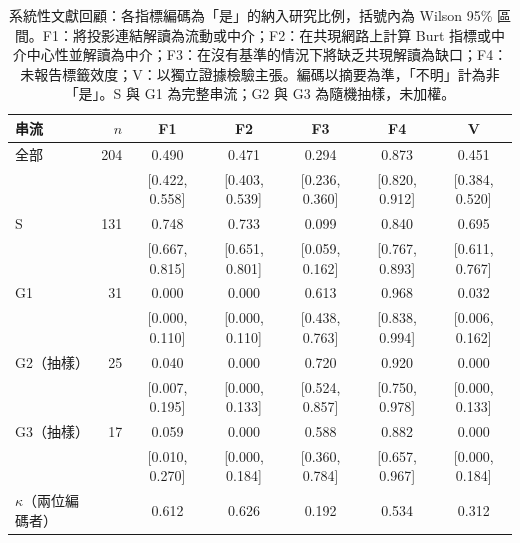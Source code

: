 \begin{table}[tbp]
  \centering
  \caption{系統性文獻回顧：各指標編碼為「是」的納入研究比例，括號內為 Wilson 95\% 區間。F1：將投影連結解讀為流動或中介；F2：在共現網路上計算 Burt 指標或中介中心性並解讀為中介；F3：在沒有基準的情況下將缺乏共現解讀為缺口；F4：未報告標籤效度；V：以獨立證據檢驗主張。編碼以摘要為準，「不明」計為非「是」。S 與 G1 為完整串流；G2 與 G3 為隨機抽樣，未加權。}
  \label{zh:tab:review}
  \small
  \begin{tabular}{lrccccc}
    \toprule
    串流 & $n$ & F1 & F2 & F3 & F4 & V \\
    \midrule
    全部 & 204 & 0.490 & 0.471 & 0.294 & 0.873 & 0.451 \\
    & & {\scriptsize [0.422, 0.558]} & {\scriptsize [0.403, 0.539]} & {\scriptsize [0.236, 0.360]} & {\scriptsize [0.820, 0.912]} & {\scriptsize [0.384, 0.520]} \\[2pt]
    S & 131 & 0.748 & 0.733 & 0.099 & 0.840 & 0.695 \\
    & & {\scriptsize [0.667, 0.815]} & {\scriptsize [0.651, 0.801]} & {\scriptsize [0.059, 0.162]} & {\scriptsize [0.767, 0.893]} & {\scriptsize [0.611, 0.767]} \\[2pt]
    G1 & 31 & 0.000 & 0.000 & 0.613 & 0.968 & 0.032 \\
    & & {\scriptsize [0.000, 0.110]} & {\scriptsize [0.000, 0.110]} & {\scriptsize [0.438, 0.763]} & {\scriptsize [0.838, 0.994]} & {\scriptsize [0.006, 0.162]} \\[2pt]
    G2（抽樣） & 25 & 0.040 & 0.000 & 0.720 & 0.920 & 0.000 \\
    & & {\scriptsize [0.007, 0.195]} & {\scriptsize [0.000, 0.133]} & {\scriptsize [0.524, 0.857]} & {\scriptsize [0.750, 0.978]} & {\scriptsize [0.000, 0.133]} \\[2pt]
    G3（抽樣） & 17 & 0.059 & 0.000 & 0.588 & 0.882 & 0.000 \\
    & & {\scriptsize [0.010, 0.270]} & {\scriptsize [0.000, 0.184]} & {\scriptsize [0.360, 0.784]} & {\scriptsize [0.657, 0.967]} & {\scriptsize [0.000, 0.184]} \\
    \midrule
    $\kappa$（兩位編碼者） & & 0.612 & 0.626 & 0.192 & 0.534 & 0.312 \\
    \bottomrule
  \end{tabular}
\end{table}


